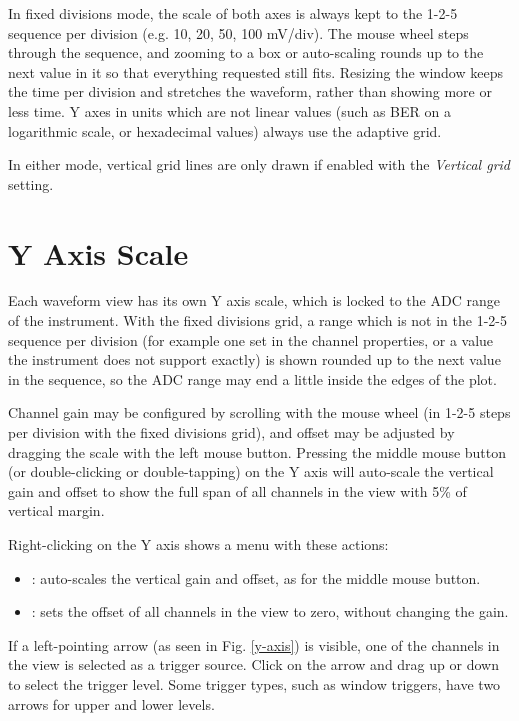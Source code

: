 In fixed divisions mode, the scale of both axes is always kept to the 1-2-5 sequence per division (e.g. 10, 20, 50,
100 mV/div). The mouse wheel steps through the sequence, and zooming to a box or auto-scaling rounds up to the next
value in it so that everything requested still fits. Resizing the window keeps the time per division and stretches
the waveform, rather than showing more or less time. Y axes in units which are not linear values (such as BER on a
logarithmic scale, or hexadecimal values) always use the adaptive grid.

In either mode, vertical grid lines are only drawn if enabled with the \emph{Vertical grid} setting.

\section{Y Axis Scale}

Each waveform view has its own Y axis scale, which is locked to the ADC range of the instrument. With the fixed
divisions grid, a range which is not in the 1-2-5 sequence per division (for example one set in the channel
properties, or a value the instrument does not support exactly) is shown rounded up to the next value in the
sequence, so the ADC range may end a little inside the edges of the plot.

Channel gain may be configured by scrolling with the mouse wheel (in 1-2-5 steps per division with the fixed divisions
grid), and offset may be adjusted by dragging the scale with the left mouse button. Pressing the middle mouse button
(or double-clicking or double-tapping) on the Y axis will auto-scale the vertical gain and offset to show the full span
of all channels in the view with 5\% of vertical margin.

Right-clicking on the Y axis shows a menu with these actions:
\begin{itemize}
\item {}: auto-scales the vertical gain and offset, as for the middle mouse button.
\item {}: sets the offset of all channels in the view to zero, without changing the gain.
\end{itemize}

If a left-pointing arrow (as seen in Fig. \ref{y-axis}) is visible, one of the channels in the view is selected as a
trigger source. Click on the arrow and drag up or down to select the trigger level. Some trigger types, such as window
triggers, have two arrows for upper and lower levels.

